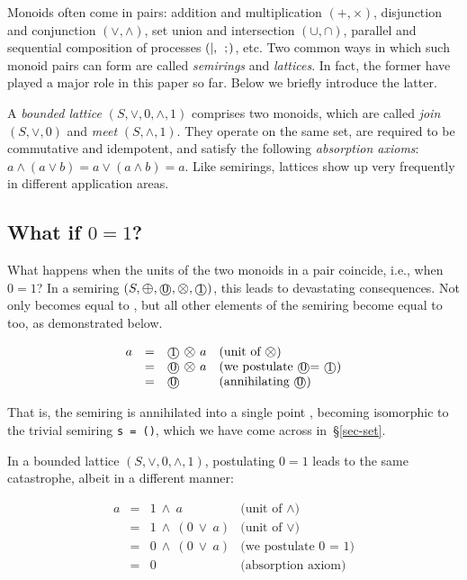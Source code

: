 \documentclass[english,submission]{programming}
\newcommand{\code}[1]{\lstinline[mathescape]|#1|}
\newcommand{\hcode}[1]{{\color{darkblue} \lstinline[keywordstyle={}]|#1|}} %
\newcommand{\add}{\text{\raisebox{-0.1mm}{\large $\oplus$}}}
\newcommand{\mul}{\text{\raisebox{-0.1mm}{\large $\otimes$}}}
\newcommand{\zero}{\raisebox{-0.2mm}{\textcircled{0}}\xspace}
\newcommand{\one}{\raisebox{-0.2mm}{\textcircled{1}}\xspace}
\begin{document}
\noindent
Monoids often come in pairs: addition and multiplication $(+, \times)$,
disjunction and conjunction $(\vee, \wedge)$, set union and intersection
$(\cup, \cap)$, parallel and sequential composition of processes
$(\text{\code{|}},\ \text{\code{;}})$, etc. Two common ways in which such monoid
pairs can form are called \emph{semirings} and \emph{lattices}. In fact, the
former have played a major role in this paper so far. Below we briefly introduce
the latter.

A \emph{bounded lattice} $(S, \vee, 0, \wedge, 1)$ comprises two monoids, which
are called \emph{join} $(S, \vee, 0)$ and \emph{meet} $(S, \wedge, 1)$. They
operate on the same set, are required to be commutative and idempotent, and
satisfy the following \emph{absorption axioms}: $a \wedge (a \vee b) = a \vee (a \wedge b) = a$. Like semirings, lattices show up very frequently in different application
areas.

\subsection{What if $0=1$?}

What happens when the units of the two monoids in a pair coincide, i.e., when
$0=1$?
In a semiring $(S, \add, \zero, \mul, \one)$, this leads to devastating
consequences. Not only \one becomes equal to \zero, but all other elements of
the semiring become equal to \zero too, as demonstrated below.

\vspace{-5mm}
\begin{equation*}
\begin{array}{rcll}
a & = & \one\ \mul\ a & \text{(unit of $\mul$)}\\
 & = & \zero\ \mul\ a & \text{(we postulate \zero = \one)}\\
 & = & \zero & \text{(annihilating \zero)}
\end{array}
\end{equation*}
\vspace{-3mm}

\noindent
That is, the semiring is annihilated into a single point \zero, becoming
isomorphic to the trivial semiring \hcode{s = ()}, which we have come across
in~\S\ref{sec-set}.

In a bounded lattice $(S, \vee, 0, \wedge, 1)$, postulating $0 = 1$ leads to the
same catastrophe, albeit in a different manner:

\vspace{-5mm}
\begin{equation*}
\begin{array}{rcll}
a & = & 1\ \wedge\ a & \text{(unit of $\wedge$)}\\
 & = & 1\ \wedge\ (0\  \vee\  a) & \text{(unit of $\vee$)}\\
 & = & 0\ \wedge\ (0\  \vee\  a) & \text{(we postulate 0 = 1)}\\
 & = & 0 & \text{(absorption axiom)}
\end{array}
\end{equation*}
\vspace{-3mm}
\end{document}
